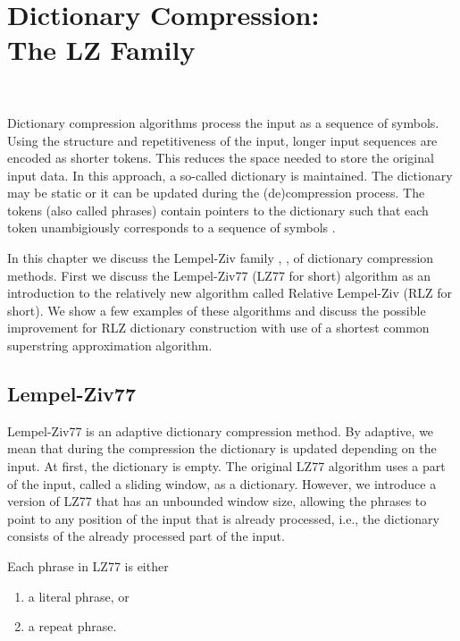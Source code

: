\documentclass[english,twoside,censored,csm,algorithms-track-2020]{HYthesisML}
\theoremstyle{plain}
\theoremstyle{definition}
\begin{document}
\chapter[Dictionary Compression: The LZ Family]{\texorpdfstring{Dictionary Compression: \\ The LZ Family}{Dictionary Compression: The LZ Family}}~\label{chp-rlz}

Dictionary compression algorithms \citep{Storer82} process the input as a sequence of symbols.
Using the structure and repetitiveness of the input, longer input sequences are encoded as shorter
tokens. This reduces the space needed to store the original input data. In this approach, a so-called
dictionary is maintained. The dictionary may be static or it can be updated during the (de)compression process.
The tokens (also called phrases) contain pointers to the dictionary such that each token
unambigiously corresponds to a sequence of symbols \citep{Pu05}.

In this chapter we discuss the Lempel-Ziv family \citep{Ziv77}, \citep{Ziv78}, \citep{Welch84}
 of dictionary compression methods.
First we discuss the Lempel-Ziv77 (LZ77 for short) algorithm
\citep{Ziv77} as an introduction to the relatively new  algorithm called
Relative Lempel-Ziv \citep{Kurppu10} (RLZ for short). We show a few examples of these algorithms and
discuss the possible improvement for RLZ dictionary construction with use of a shortest common
superstring approximation algorithm.

\section{Lempel-Ziv77}

Lempel-Ziv77 is an adaptive dictionary compression method. By adaptive, we mean that during the
compression the dictionary is updated depending on the input. At first, the dictionary is empty. 
The original LZ77 algorithm uses a part of the input, called a sliding window, as a dictionary.
However, we introduce a version of LZ77 that has an unbounded window size, allowing the phrases
to point to any position of the input that is already processed, i.e., the dictionary consists of the
already processed part of the input.

Each phrase in LZ77 is either 
\begin{enumerate}
\item a literal phrase, or
\item a repeat phrase.
\end{enumerate}
\end{document}
